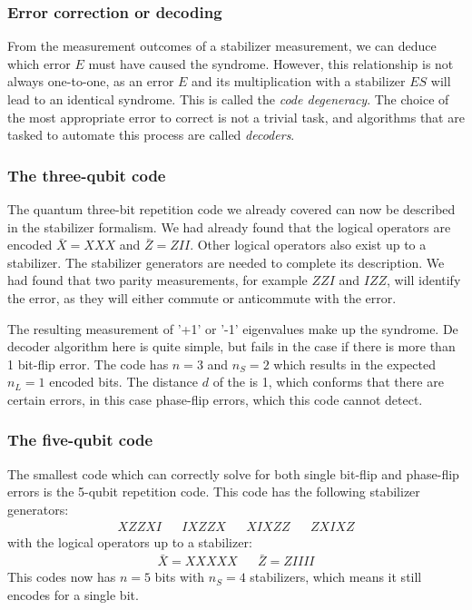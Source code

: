 \subsubsection{Error correction or decoding}

From the measurement outcomes of a stabilizer measurement, we can deduce which error $E$ must have caused the syndrome. However, this relationship is not always one-to-one, as an error $E$ and its multiplication with a stabilizer $ES$ will lead to an identical syndrome. This is called the \emph{code degeneracy}. The choice of the most appropriate error to correct is not a trivial task, and algorithms that are tasked to automate this process are called \emph{decoders}.


\subsubsection{The three-qubit code}

The quantum three-bit repetition code we already covered can now be described in the stabilizer formalism. We had already found that the logical operators are encoded $\bar{X} = XXX$ and $\bar{Z} = ZII$. Other logical operators also exist up to a stabilizer. The stabilizer generators are needed to complete its description. We had found that two parity measurements, for example $ZZI$ and $IZZ$, will identify the error, as they will either commute or anticommute with the error.

The resulting measurement of '+1' or '-1' eigenvalues make up the syndrome. De decoder algorithm here is quite simple, but fails in the case if there is more than 1 bit-flip error. The code has $n=3$ and $n_S=2$ which results in the expected $n_L = 1$ encoded bits. The distance $d$ of the is 1, which conforms that there are certain errors, in this case phase-flip errors, which this code cannot detect.

\subsubsection{The five-qubit code}
The smallest code which can correctly solve for both single bit-flip and phase-flip errors is the 5-qubit repetition code. This code has the following stabilizer generators:
\begin{align}
  XZZXI && IXZZX && XIXZZ && ZXIXZ
\end{align}
with the logical operators up to a stabilizer:
\begin{align}
  & \bar{X} = XXXXX && \bar{Z} = ZIIII &
\end{align}
This codes now has $n=5$ bits with $n_S = 4$ stabilizers, which means it still encodes for a single bit.


